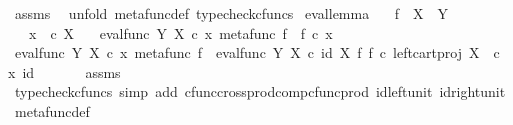 \begin{isabellebody}
%
\isatagproof
{}\isamarkupfalse%
\ assms\ \isamarkupfalse%
\ {\isacharparenleft}{\kern0pt}unfold\ metafunc{\isacharunderscore}{\kern0pt}def{}{\isacharcomma}{\kern0pt}\ typecheck{\isacharunderscore}{\kern0pt}cfuncs{\isacharparenright}{\kern0pt}%
\endisatagproof
{\isafoldproof}%
%
\isadelimproof
\isanewline
%
\endisadelimproof
\isanewline
{}\isamarkupfalse%
\ eval{\isacharunderscore}{\kern0pt}lemma{\isacharcolon}{\kern0pt}\isanewline
\ \ \ {\isachardoublequoteopen}f\ {\isacharcolon}{\kern0pt}\ X\ {\isasymrightarrow}\ Y{\isachardoublequoteclose}\isanewline
\ \ \ {\isachardoublequoteopen}x\ \ {\isasymin}\isactrlsub c\ X{\isachardoublequoteclose}\isanewline
\ \ \ {\isachardoublequoteopen}eval{\isacharunderscore}{\kern0pt}func\ Y\ X\ {\isasymcirc}\isactrlsub c\ {\isasymlangle}x{\isacharcomma}{\kern0pt}\ metafunc\ f{\isasymrangle}\ {\isacharequal}{\kern0pt}\ f\ {\isasymcirc}\isactrlsub c\ x{\isachardoublequoteclose}\isanewline
%
\isadelimproof
%
\endisadelimproof
%
\isatagproof
{}\isamarkupfalse%
\ {\isacharminus}{\kern0pt}\ \isanewline
\ \ \isamarkupfalse%
\ {\isachardoublequoteopen}eval{\isacharunderscore}{\kern0pt}func\ Y\ X\ {\isasymcirc}\isactrlsub c\ {\isasymlangle}x{\isacharcomma}{\kern0pt}\ metafunc\ f{\isasymrangle}\ {\isacharequal}{\kern0pt}\ eval{\isacharunderscore}{\kern0pt}func\ Y\ X\ {\isasymcirc}\isactrlsub c\ {\isacharparenleft}{\kern0pt}id\ X\ {\isasymtimes}\isactrlsub f\ {\isacharparenleft}{\kern0pt}f\ {\isasymcirc}\isactrlsub c\ {\isacharparenleft}{\kern0pt}left{\isacharunderscore}{\kern0pt}cart{\isacharunderscore}{\kern0pt}proj\ X\ {\isasymone}{\isacharparenright}{\kern0pt}{\isacharparenright}{\kern0pt}\isactrlsup {\isasymsharp}{\isacharparenright}{\kern0pt}\ {\isasymcirc}\isactrlsub c\ {\isasymlangle}x{\isacharcomma}{\kern0pt}\ id\ {\isasymone}{\isasymrangle}{\isachardoublequoteclose}\isanewline
\ \ \ \ \isamarkupfalse%
\ assms\ \isamarkupfalse%
\ {\isacharparenleft}{\kern0pt}typecheck{\isacharunderscore}{\kern0pt}cfuncs{\isacharcomma}{\kern0pt}\ simp\ add{\isacharcolon}{\kern0pt}\ cfunc{\isacharunderscore}{\kern0pt}cross{\isacharunderscore}{\kern0pt}prod{\isacharunderscore}{\kern0pt}comp{\isacharunderscore}{\kern0pt}cfunc{\isacharunderscore}{\kern0pt}prod\ id{\isacharunderscore}{\kern0pt}left{\isacharunderscore}{\kern0pt}unit{}\ id{\isacharunderscore}{\kern0pt}right{\isacharunderscore}{\kern0pt}unit{}\ metafunc{\isacharunderscore}{\kern0pt}def{}{\isacharparenright}{\kern0pt}\isanewline

\end{isabellebody}
